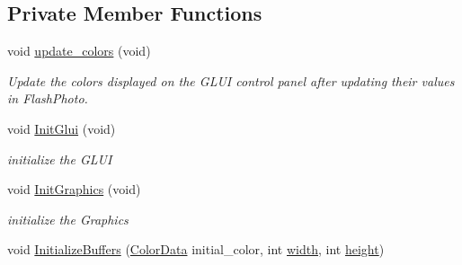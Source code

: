 \subsection*{Private Member Functions}
\begin{DoxyCompactItemize}
\item 
void \hyperlink{classimage__tools_1_1FlashPhotoApp_a4d51fdabaff836fc55a4f72a465773e7}{update\+\_\+colors} (void)\hypertarget{classimage__tools_1_1FlashPhotoApp_a4d51fdabaff836fc55a4f72a465773e7}{}\label{classimage__tools_1_1FlashPhotoApp_a4d51fdabaff836fc55a4f72a465773e7}

\begin{DoxyCompactList}\small\item\em Update the colors displayed on the G\+L\+UI control panel after updating their values in Flash\+Photo. \end{DoxyCompactList}\item 
void \hyperlink{classimage__tools_1_1FlashPhotoApp_a7e66fc64a72ba17648cb99491c773c9b}{Init\+Glui} (void)\hypertarget{classimage__tools_1_1FlashPhotoApp_a7e66fc64a72ba17648cb99491c773c9b}{}\label{classimage__tools_1_1FlashPhotoApp_a7e66fc64a72ba17648cb99491c773c9b}

\begin{DoxyCompactList}\small\item\em initialize the G\+L\+UI \end{DoxyCompactList}\item 
void \hyperlink{classimage__tools_1_1FlashPhotoApp_ac529b21d6c3466ed1b40cc159b172d0d}{Init\+Graphics} (void)\hypertarget{classimage__tools_1_1FlashPhotoApp_ac529b21d6c3466ed1b40cc159b172d0d}{}\label{classimage__tools_1_1FlashPhotoApp_ac529b21d6c3466ed1b40cc159b172d0d}

\begin{DoxyCompactList}\small\item\em initialize the Graphics \end{DoxyCompactList}\item 
void \hyperlink{classimage__tools_1_1FlashPhotoApp_a08e318814d7f7fb1aa2c05a61711f672}{Initialize\+Buffers} (\hyperlink{classimage__tools_1_1ColorData}{Color\+Data} initial\+\_\+color, int \hyperlink{classimage__tools_1_1BaseGfxApp_a2fe403c5392f624477c2ce4429f1a7b5}{width}, int \hyperlink{classimage__tools_1_1BaseGfxApp_aa961e13a7a8e6062204223cc33ac7503}{height})\hypertarget{classimage__tools_1_1FlashPhotoApp_a08e318814d7f7fb1aa2c05a61711f672}{}\label{classimage__tools_1_1FlashPhotoApp_a08e318814d7f7fb1aa2c05a61711f672}


\end{DoxyCompactItemize}
